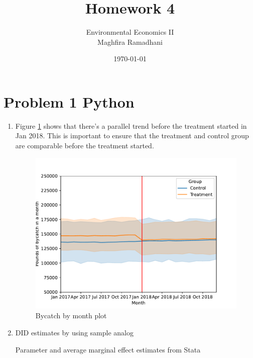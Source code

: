 \documentclass{article}
\begin{document}
 
\title{Homework 4}
\author{Environmental Economics II\\
Maghfira Ramadhani}
\date{\today}
\maketitle

\section*{Problem 1 Python}
\begin{enumerate}
\item Figure \ref{f1:paralleltrend} shows that there's a parallel trend before the treatment started in Jan 2018. This is important to ensure that the treatment and control group are comparable before the treatment started.
\begin{figure}[H]
\centering
\includegraphics[scale = 0.7]{./figure/paralleltrend.pdf}
\caption{Bycatch by month plot}
\label{f1:paralleltrend}
\end{figure}

\item DID estimates by using sample analog
\begin{table}[H]\centering
\begin{threeparttable}
\caption{Parameter and average marginal effect estimates from Stata}
\label{t1:didstimates}

\end{threeparttable}
\end{table}


\end{enumerate}
\end{document}

